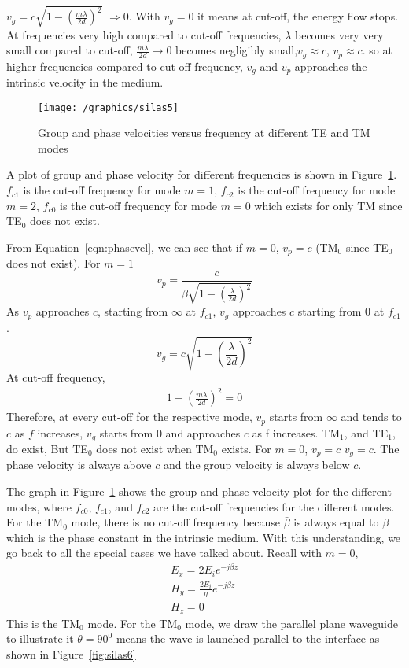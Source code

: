 $v_{g} =c \sqrt{1-(\frac{m\lambda}{2d})^{2}}$ $\Rightarrow 0$. With $v_{g} = 0$ it means at cut-off, the energy flow stops. At frequencies very high compared to cut-off frequencies, $\lambda$ becomes very very small compared to cut-off, $\frac{m\lambda}{2d} \rightarrow 0$ becomes negligibly small,$v_{g} \approx c$, $v_{p} \approx c$. so at higher frequencies compared to cut-off frequency, $v_{g}$ and $v_{p}$ approaches the intrinsic velocity in the medium.
\begin{figure}[h]
\centering
\texttt{[image: /graphics/silas5]}
\caption{Group and phase velocities versus frequency at different TE and TM modes}
\label{fig:silas5}
\end{figure}
A plot of group and phase velocity for different frequencies is shown in Figure~\ref{fig:silas5}. $f_{c1}$ is the cut-off frequency for mode $m=1$, $f_{c2}$ is the cut-off frequency for mode $m=2$, $f_{c0}$ is the cut-off frequency for mode $m=0$ which exists for only TM since TE$_0$ does not exist.

From Equation~\ref{eqn:phasevel}, we can see that if $m=0$, $v_{p} =c$ (TM$_0$ since TE$_0$ does not exist). For $m=1$
\begin{equation*}
v_{p}= \frac{c}{\beta \sqrt{1- \left(\frac{\lambda}{2d}\right)^{2}}}
\end{equation*}
As $v_{p}$ approaches $c$, starting from $\infty$ at $f_{c1}$, $v_{g}$ approaches $c$ starting from 0 at $f_{c1}$.
\begin{equation*}
v_{g}= c\sqrt{1-\left(\frac{\lambda}{2d}\right)^{2}}
\end{equation*}
At cut-off frequency, 
\begin{align*}
1-\left(\frac{m\lambda}{2d}\right)^{2} = 0
\end{align*}
Therefore, at every cut-off for the respective mode, $v_{p}$ starts from $\infty$ and tends to $c$ as $f$ increases, $v_{g}$ starts from 0 and approaches $c$ as f increases. TM$_1$, and TE$_1$, do exist, But TE$_0$ does not exist when TM$_0$ exists. For $m = 0$, $v_{p}=c$ $v_{g}=c$. The phase velocity is always above $c$ and the group velocity is always below $c$.

The graph in Figure~\ref{fig:silas5} shows the group and phase velocity plot for the different modes, where $f_{c0}$, $f_{c1}$, and $f_{c2}$ are the cut-off frequencies for the different modes. For the TM$_0$ mode, there is no cut-off frequency because $\bar{\beta}$ is always equal to $\beta$ which is the phase constant in the intrinsic medium. With this understanding, we go back to all the special cases we have talked about. Recall with $m = 0$, 
\begin{align*}
E_{x} =2E_{i} e^{-j\beta z}\\
H_{y} = \frac{2E_{i}}{\eta} e^{-j\beta z}\\
H_{z} =0
\end{align*}
This is the TM$_0$ mode. For the TM$_0$ mode, we draw the parallel plane waveguide to illustrate it $\theta =90^{0}$ means the wave is launched parallel to the interface as shown in Figure~\ref{fig:silas6}

